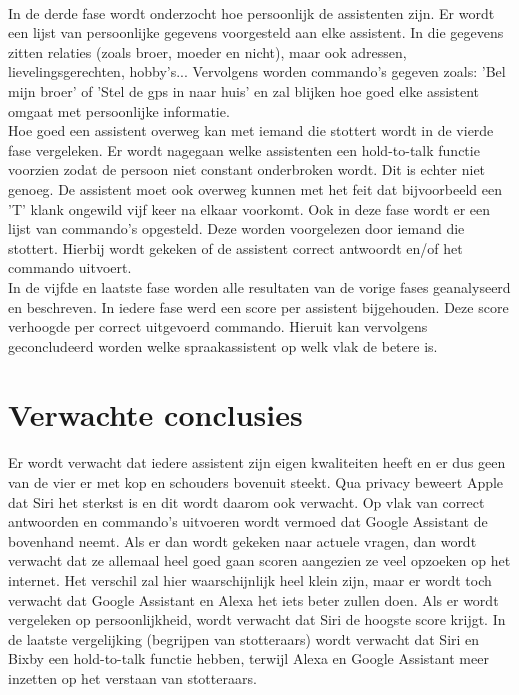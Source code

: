 \documentclass{hogent-article}
\begin{document}
\\\indent
In de derde fase wordt onderzocht hoe persoonlijk de assistenten zijn. Er wordt een lijst van persoonlijke gegevens voorgesteld aan elke assistent. In die gegevens zitten relaties (zoals broer, moeder en nicht), maar ook adressen, lievelingsgerechten, hobby's... Vervolgens worden commando's gegeven zoals: 'Bel mijn broer' of 'Stel de gps in naar huis' en zal blijken hoe goed elke assistent omgaat met persoonlijke informatie.
\\\indent
Hoe goed een assistent overweg kan met iemand die stottert wordt in de vierde fase vergeleken. Er wordt nagegaan welke assistenten een hold-to-talk functie voorzien zodat de persoon niet constant onderbroken wordt. Dit is echter niet genoeg. De assistent moet ook overweg kunnen met het feit dat bijvoorbeeld een 'T' klank ongewild vijf keer na elkaar voorkomt. Ook in deze fase wordt er een lijst van commando's opgesteld. Deze worden voorgelezen door iemand die stottert. Hierbij wordt gekeken of de assistent correct antwoordt en/of het commando uitvoert.
\\\indent
In de vijfde en laatste fase worden alle resultaten van de vorige fases geanalyseerd en beschreven. In iedere fase werd een score per assistent bijgehouden. Deze score verhoogde per correct uitgevoerd commando. Hieruit kan vervolgens geconcludeerd worden welke spraakassistent op welk vlak de betere is.

\section{Verwachte conclusies}



Er wordt verwacht dat iedere assistent zijn eigen kwaliteiten heeft en er dus geen van de vier er met kop en schouders bovenuit steekt. Qua privacy beweert Apple dat Siri het sterkst is en dit wordt daarom ook verwacht. Op vlak van correct antwoorden en commando's uitvoeren wordt vermoed dat Google Assistant de bovenhand neemt. Als er dan wordt gekeken naar actuele vragen, dan wordt verwacht dat ze allemaal heel goed gaan scoren aangezien ze veel opzoeken op het internet. Het verschil zal hier waarschijnlijk heel klein zijn, maar er wordt toch verwacht dat Google Assistant en Alexa het iets beter zullen doen. Als er wordt vergeleken op persoonlijkheid, wordt verwacht dat Siri de hoogste score krijgt. In de laatste vergelijking (begrijpen van stotteraars) wordt verwacht dat Siri en Bixby een hold-to-talk functie hebben, terwijl Alexa en Google Assistant meer inzetten op het verstaan van stotteraars.
\end{document}
